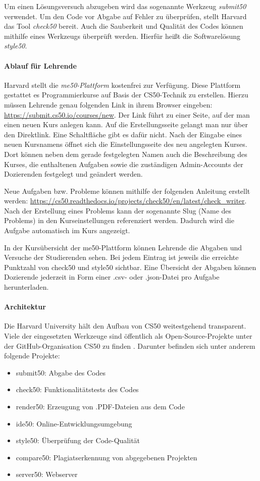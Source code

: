 Um einen Lösungsversuch abzugeben wird das sogenannte Werkzeug \emph{submit50}
verwendet. Um den Code vor Abgabe auf Fehler zu überprüfen, stellt Harvard das
Tool \emph{check50} bereit. Auch die Sauberkeit und Qualität des Codes können
mithilfe eines Werkzeugs überprüft werden. Hierfür heißt die Softwarelösung
\emph{style50}. \parencite{submit50}

\paragraph{Ablauf für Lehrende}
Harvard stellt die \emph{me50-Plattform} kostenfrei zur Verfügung. Diese
Plattform gestattet es Programmierkurse auf Basis der CS50-Technik zu
erstellen. Hierzu müssen Lehrende genau folgenden Link in ihrem Browser
eingeben: \url{https://submit.cs50.io/courses/new}. Der Link führt zu einer
Seite, auf der man einen neuen Kurs anlegen kann. Auf die Erstellungsseite
gelangt man nur über den Direktlink. Eine Schaltfläche gibt es dafür nicht.
Nach der Eingabe eines neuen Kursnamens öffnet sich die Einstellungsseite des
neu angelegten Kurses. Dort können neben dem gerade festgelegten Namen auch die
Beschreibung des Kurses, die enthaltenen Aufgaben sowie die zuständigen
Admin-Accounts der Dozierenden festgelegt und geändert werden.

Neue Aufgaben bzw. Probleme können mithilfe der folgenden Anleitung
erstellt werden:
\url{https://cs50.readthedocs.io/projects/check50/en/latest/check_writer}. Nach
der Erstellung eines Problems kann der sogenannte Slug (Name des Problems) in
den Kurseinstellungen referenziert werden. Dadurch wird die Aufgabe automatisch
im Kurs angezeigt.

In der Kursübersicht der me50-Plattform können Lehrende die Abgaben und Versuche
der Studierenden sehen. Bei jedem Eintrag ist jeweils die erreichte Punktzahl
von check50 und style50 sichtbar. Eine Übersicht der Abgaben können Dozierende
jederzeit in Form einer .csv- oder .json-Datei pro Aufgabe herunterladen.

\paragraph{Architektur}
Die Harvard University hält den Aufbau von CS50 weitestgehend transparent.
Viele der eingesetzten Werkzeuge sind öffentlich als Open-Source-Projekte unter
der GitHub-Organisation \glqq CS50\grqq{} zu finden \parencite{cs50-github}.
Darunter befinden sich unter anderem folgende Projekte:
\begin{itemize}
\item submit50: Abgabe des Codes
\item check50: Funktionalitätstests des Codes
\item render50: Erzeugung von .PDF-Dateien aus dem Code
\item ide50: Online-Entwicklungsumgebung
\item style50: Überprüfung der Code-Qualität
\item compare50: Plagiatserkennung von abgegebenen Projekten
\item server50: Webserver
\end{itemize}

